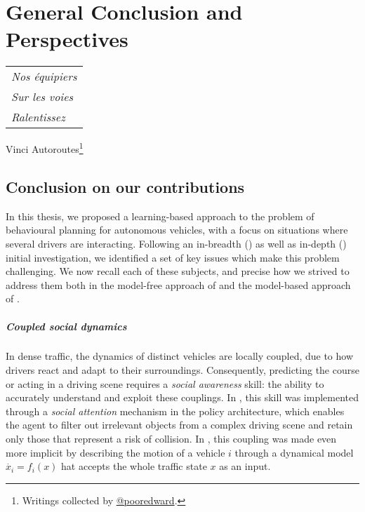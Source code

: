 
\makeatletter
\def\toclevel@chapter{-1}
\makeatother

\chapter{General Conclusion and Perspectives}
\label{chapter:conclusion}

\begin{flushright}
	\begin{tabular}{@{}l@{}}
		\emph{Nos équipiers}\\
		\emph{\hspace*{1.0cm}Sur les voies}\\
		\emph{\hspace*{0.5cm}Ralentissez}\\
	\end{tabular}

	Vinci Autoroutes\footnote{Writings collected by \href{https://twitter.com/pooredward/status/1273249408231124994}
		{@pooredward}.}\hspace*{1cm}
\end{flushright}

\section{Conclusion on our contributions}
In this thesis, we proposed a learning-based approach to the problem of behavioural planning for autonomous vehicles, with a focus on situations where several drivers are interacting. Following an in-breadth () as well as in-depth () initial investigation, we identified a set of key issues which make this problem challenging. We now recall each of these subjects, and precise how we strived to address them both in the model-free approach of  and the model-based approach of .

\paragraph{Coupled social dynamics}
In dense traffic, the dynamics of distinct vehicles are locally coupled, due to how drivers react and adapt to their surroundings. Consequently, predicting the course or acting in a driving scene requires a \emph{social awareness} skill: the ability to accurately understand and exploit these couplings.
In , this skill was implemented through a \emph{social attention} mechanism in the policy architecture, which enables the agent to filter out irrelevant objects from a complex driving scene and retain only those that represent a risk of collision. In , this coupling was made even more implicit by describing the motion of a vehicle $i$ through a dynamical model $\dot{x_i} = f_i(x)$ hat accepts the whole traffic state $x$ as an input.

